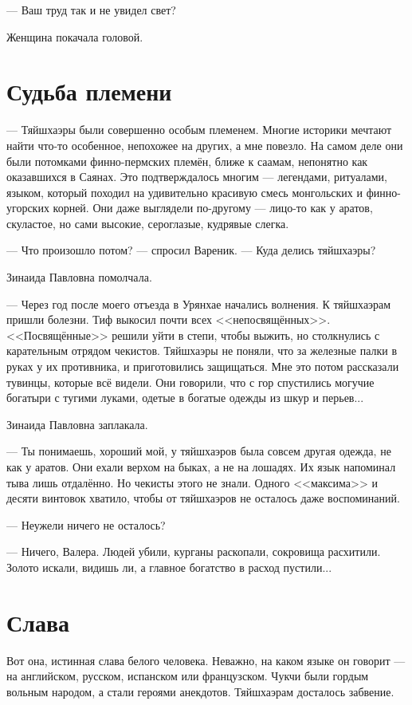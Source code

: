 \documentclass[a4paper,10pt,fleqn]{book}\usepackage{polyglossia}\setdefaultlanguage{english}\setotherlanguage{russian}\defaultfontfeatures{Ligatures=TeX,Mapping=tex-text} \usepackage{xcolor}\definecolor{lightgray}{HTML}{bbbbbb}\color{lightgray}\newcommand{\ml}[3]{\textcolor{black}{#3}}
\begin{document}
--- Ваш труд так и не увидел свет?

Женщина покачала головой.

\section{Судьба племени}

--- Тяйшхаэры были совершенно особым племенем.
Многие историки мечтают найти что-то особенное, непохожее на других, а мне повезло.
На самом деле они были потомками финно-пермских племён, ближе к саамам, непонятно как оказавшихся в Саянах.
Это подтверждалось многим --- легендами, ритуалами, языком, который походил на удивительно красивую смесь монгольских и финно-угорских корней.
Они даже выглядели по-другому --- лицо-то как у аратов, скуластое, но сами высокие, сероглазые, кудрявые слегка.

--- Что произошло потом? --- спросил Вареник.
--- Куда делись тяйшхаэры?

Зинаида Павловна помолчала.

--- Через год после моего отъезда в Урянхае начались волнения.
К тяйшхаэрам пришли болезни.
Тиф выкосил почти всех <<непосвящённых>>.
<<Посвящённые>> решили уйти в степи, чтобы выжить, но столкнулись с карательным отрядом чекистов.
Тяйшхаэры не поняли, что за железные палки в руках у их противника, и приготовились защищаться.
Мне это потом рассказали тувинцы, которые всё видели.
Они говорили, что с гор спустились могучие богатыри с тугими луками, одетые в богатые одежды из шкур и перьев...

Зинаида Павловна заплакала.

--- Ты понимаешь, хороший мой, у тяйшхаэров была совсем другая одежда, не как у аратов.
Они ехали верхом на быках, а не на лошадях.
Их язык напоминал тыва лишь отдалённо.
Но чекисты этого не знали.
Одного <<максима>> и десяти винтовок хватило, чтобы от тяйшхаэров не осталось даже воспоминаний.

--- Неужели ничего не осталось?

--- Ничего, Валера.
Людей убили, курганы раскопали, сокровища расхитили.
Золото искали, видишь ли, а главное богатство в расход пустили...

\section{Слава}

Вот она, истинная слава белого человека.
Неважно, на каком языке он говорит --- на английском, русском, испанском или французском.
Чукчи были гордым вольным народом, а стали героями анекдотов.
Тяйшхаэрам досталось забвение.
\end{document}
